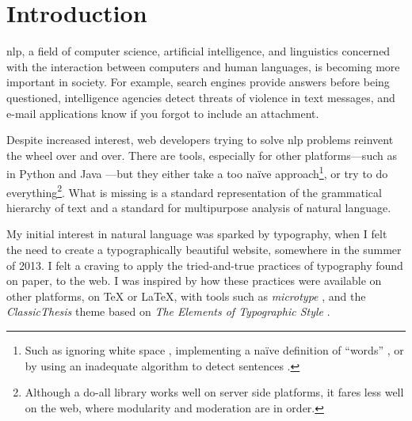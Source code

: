
\begingroup
\let\clearpage\relax
\let\cleardoublepage\relax
\let\cleardoublepage\relax

\chapter*{Introduction}

\Gls{nlp}, a field of computer science, artificial intelligence, and
  linguistics concerned with the interaction between computers and human
  languages, is becoming more important in society.
For example, search engines provide answers before being questioned,
  intelligence agencies detect threats of violence in text messages, and
  e-mail applications know if you forgot to include an attachment.

Despite increased interest, web developers trying to solve \gls{nlp} problems
  reinvent the wheel over and over.
There are tools, especially for other platforms---such as in Python
  \autocite{nltk-source} and Java \autocite{opennlp-source}---but they either
  take a too na\"ive approach\footnote{Such as ignoring white space
    \autocite{loadfive/knwl-source-code}, implementing a na\"ive
    definition of ``words'' \autocite{nhunzaker/speakeasy-source-code},
    or by using an inadequate algorithm to detect sentences
    \autocite[][]{nytimes/emphasis-source-code}.}, or try to do
  everything\footnote{Although a do-all library \autocite[such
  as][]{NaturalNode/natural-source-code} works well on server side
  platforms, it fares less well on the web, where modularity and moderation
  are in order.}.
What is missing is a standard representation of the grammatical hierarchy
  of text and a standard for multipurpose analysis of natural language.

My initial interest in natural language was sparked by typography, when I
  felt the need to create a typographically beautiful website, somewhere in
  the summer of 2013.
I felt a craving to apply the tried-and-true practices of typography found on
  paper, to the web.
I was inspired by how these practices were available on other platforms,
  on \TeX{} or \LaTeX, with tools such as \emph{microtype} \autocite{microtype},
  and the \emph{ClassicThesis} theme \autocite{classicthesis} based on
  \emph{The Elements of Typographic Style}
  \autocite{bringhurst-element-typographic-style}.

